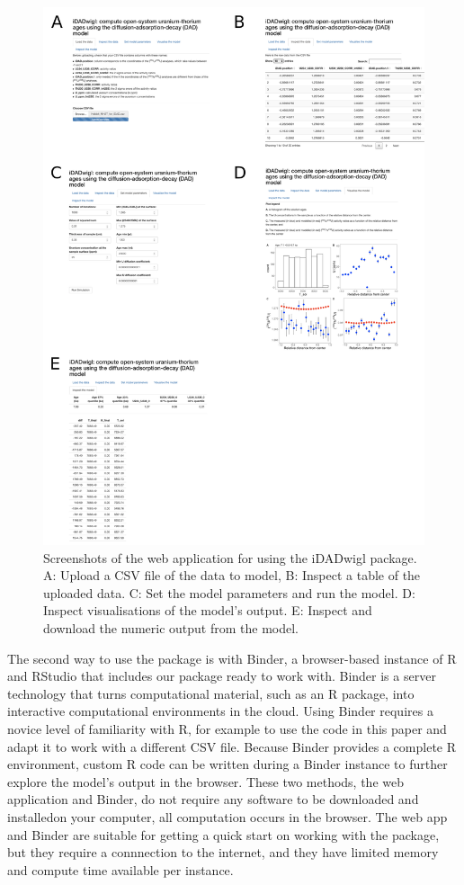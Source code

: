 \documentclass[]{elsarticle} %
\begin{document}
\begin{figure}
\includegraphics[width=0.95\linewidth]{figures/shiny-app-screenshots} \caption{Screenshots of the web application for using the iDADwigl package. A: Upload a CSV file of the data to model, B: Inspect a table of the uploaded data. C: Set the model parameters and run the model. D: Inspect visualisations of the model's output. E: Inspect and download the numeric output from the model.}\label{fig:shinyfig}
\end{figure}

The second way to use the package is with Binder, a browser-based instance of R and RStudio that includes our package ready to work with. Binder is a server technology that turns computational material, such as an R package, into interactive computational environments in the cloud. Using Binder requires a novice level of familiarity with R, for example to use the code in this paper and adapt it to work with a different CSV file. Because Binder provides a complete R environment, custom R code can be written during a Binder instance to further explore the model's output in the browser. These two methods, the web application and Binder, do not require any software to be downloaded and installedon your computer, all computation occurs in the browser. The web app and Binder are suitable for getting a quick start on working with the package, but they require a connnection to the internet, and they have limited memory and compute time available per instance.
\end{document}
